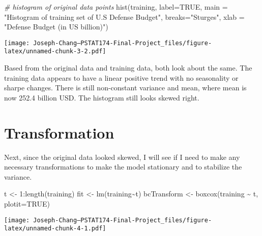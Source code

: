 \documentclass[
]{article}
\newenvironment{Shaded}{\begin{snugshade}}{\end{snugshade}}
\newcommand{\AttributeTok}[1]{\textcolor[rgb]{0.77,0.63,0.00}{#1}}
\newcommand{\CommentTok}[1]{\textcolor[rgb]{0.56,0.35,0.01}{\textit{#1}}}
\newcommand{\ConstantTok}[1]{\textcolor[rgb]{0.00,0.00,0.00}{#1}}
\newcommand{\DecValTok}[1]{\textcolor[rgb]{0.00,0.00,0.81}{#1}}
\newcommand{\FunctionTok}[1]{\textcolor[rgb]{0.00,0.00,0.00}{#1}}
\newcommand{\NormalTok}[1]{#1}
\newcommand{\OtherTok}[1]{\textcolor[rgb]{0.56,0.35,0.01}{#1}}
\newcommand{\SpecialCharTok}[1]{\textcolor[rgb]{0.00,0.00,0.00}{#1}}
\newcommand{\StringTok}[1]{\textcolor[rgb]{0.31,0.60,0.02}{#1}}
\begin{document}
\begin{Shaded}
\begin{Highlighting}[]
\CommentTok{\# histogram of original data points}
\FunctionTok{hist}\NormalTok{(training, }\AttributeTok{label=}\ConstantTok{TRUE}\NormalTok{, }\AttributeTok{main =} \StringTok{"Histogram of training set of U.S Defense Budget"}\NormalTok{, }\AttributeTok{breaks=}\StringTok{"Sturges"}\NormalTok{, }\AttributeTok{xlab =} \StringTok{"Defense Budget (in US billion)"}\NormalTok{)}
\end{Highlighting}
\end{Shaded}

\texttt{[image: Joseph-Chang---PSTAT174-Final-Project\_files/figure-latex/unnamed-chunk-3-2.pdf]}

Based from the original data and training data, both look about the
same. The training data appears to have a linear positive trend with no
seasonality or sharpe changes. There is still non-constant variance and
mean, where mean is now 252.4 billion USD. The histogram still looks
skewed right.

\hypertarget{transformation}{%
\section{Transformation}\label{transformation}}

Next, since the original data looked skewed, I will see if I need to
make any necessary transformations to make the model stationary and to
stabilize the variance.

\begin{Shaded}
\begin{Highlighting}[]
\NormalTok{t }\OtherTok{\textless{}{-}} \DecValTok{1}\SpecialCharTok{:}\FunctionTok{length}\NormalTok{(training)}
\NormalTok{fit }\OtherTok{\textless{}{-}} \FunctionTok{lm}\NormalTok{(training}\SpecialCharTok{\textasciitilde{}}\NormalTok{t)}
\NormalTok{bcTransform }\OtherTok{\textless{}{-}} \FunctionTok{boxcox}\NormalTok{(training }\SpecialCharTok{\textasciitilde{}}\NormalTok{ t, }\AttributeTok{plotit=}\ConstantTok{TRUE}\NormalTok{)}
\end{Highlighting}
\end{Shaded}

\texttt{[image: Joseph-Chang---PSTAT174-Final-Project\_files/figure-latex/unnamed-chunk-4-1.pdf]}

\begin{Shaded}
\end{Shaded}
\end{document}
